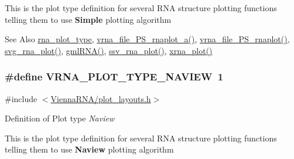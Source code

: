 This is the plot type definition for several R\-N\-A structure plotting functions telling them to use {\bfseries Simple} plotting algorithm

\begin{DoxySeeAlso}{See Also}
\hyperlink{group__plotting__utils_ga5964c4581431b098b80027d6e14dcdd4}{rna\-\_\-plot\-\_\-type}, \hyperlink{group__plotting__utils_ga139a31dd0ba9fc6612431f67de901c31}{vrna\-\_\-file\-\_\-\-P\-S\-\_\-rnaplot\-\_\-a()}, \hyperlink{group__plotting__utils_gabdc8f6548ba4a3bc3cd868ccbcfdb86a}{vrna\-\_\-file\-\_\-\-P\-S\-\_\-rnaplot()}, \hyperlink{group__plotting__utils_gae7853539b5df98f294b4af434e979304}{svg\-\_\-rna\-\_\-plot()}, \hyperlink{group__plotting__utils_ga70834bc8c0aad4fe6824ff76ccb8f329}{gml\-R\-N\-A()}, \hyperlink{group__plotting__utils_gadd368528755f9a830727b680243541df}{ssv\-\_\-rna\-\_\-plot()}, \hyperlink{group__plotting__utils_ga2f6d5953e6a323df898896b8d6614483}{xrna\-\_\-plot()} 
\end{DoxySeeAlso}
\hypertarget{group__plotting__utils_ga94d4c863ecac2f220f76658afb92f964}{
\subsubsection[{V\-R\-N\-A\-\_\-\-P\-L\-O\-T\-\_\-\-T\-Y\-P\-E\-\_\-\-N\-A\-V\-I\-E\-W}]{\setlength{\rightskip}{0pt plus 5cm}\#define V\-R\-N\-A\-\_\-\-P\-L\-O\-T\-\_\-\-T\-Y\-P\-E\-\_\-\-N\-A\-V\-I\-E\-W~1}}\label{group__plotting__utils_ga94d4c863ecac2f220f76658afb92f964}


{\ttfamily \#include $<$\hyperlink{plot__layouts_8h}{Vienna\-R\-N\-A/plot\-\_\-layouts.\-h}$>$}



Definition of Plot type {\itshape Naview} 

This is the plot type definition for several R\-N\-A structure plotting functions telling them to use {\bfseries Naview} plotting algorithm


